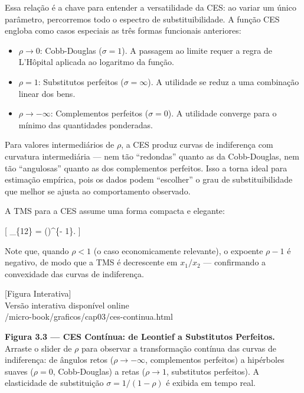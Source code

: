 \documentclass[11pt,twoside,openright]{book}
\newcommand{\figurePlaceholder}[1]{%
  \begin{center}
    \begin{tcolorbox}[
      width=0.85\textwidth,
      colback=graybg,
      colframe=gray,
      boxrule=0.5pt,
      arc=2pt,
      halign=center,
      valign=center,
      height=5cm
    ]
      \centering
      \vfill
      {\sffamily\color{gray}\large [Figura Interativa]}\\[6pt]
      {\sffamily\small\color{gray} Versão interativa disponível online}\\[4pt]
      {\ttfamily\tiny\color{gray} #1}
      \vfill
    \end{tcolorbox}
  \end{center}
}
\providecommand{\tightlist}{\setlength{\itemsep}{0pt}\setlength{\parskip}{0pt}}
\begin{document}
Essa relação é a chave para entender a versatilidade da CES: ao variar
um único parâmetro, percorremos todo o espectro de substituibilidade. A
função CES engloba como casos especiais as três formas funcionais
anteriores:

\begin{itemize}
\tightlist
\item
  \(\rho \to 0\): Cobb-Douglas (\(\sigma = 1\)). A passagem ao limite
  requer a regra de L'Hôpital aplicada ao logaritmo da função.
\item
  \(\rho = 1\): Substitutos perfeitos (\(\sigma = \infty\)). A utilidade
  se reduz a uma combinação linear dos bens.
\item
  \(\rho \to -\infty\): Complementos perfeitos (\(\sigma = 0\)). A
  utilidade converge para o mínimo das quantidades ponderadas.
\end{itemize}

Para valores intermediários de \(\rho\), a CES produz curvas de
indiferença com curvatura intermediária --- nem tão ``redondas'' quanto
as da Cobb-Douglas, nem tão ``angulosas'' quanto as dos complementos
perfeitos. Isso a torna ideal para estimação empírica, pois os dados
podem ``escolher'' o grau de substituibilidade que melhor se ajusta ao
comportamento observado.

A TMS para a CES assume uma forma compacta e elegante:

{[} \_\{12\} = \left(\right)\^{}\{\rho - 1\}.
\label{eq:3.6.12}  {]}

Note que, quando \(\rho < 1\) (o caso economicamente relevante), o
expoente \(\rho - 1\) é negativo, de modo que a TMS é decrescente em
\(x_1/x_2\) --- confirmando a convexidade das curvas de indiferença.

\figurePlaceholder{/micro-book/graficos/cap03/ces-continua.html}

\textbf{Figura 3.3 --- CES Contínua: de Leontief a Substitutos
Perfeitos.} Arraste o slider de \(\rho\) para observar a transformação
contínua das curvas de indiferença: de ângulos retos
(\(\rho \to -\infty\), complementos perfeitos) a hipérboles suaves
(\(\rho = 0\), Cobb-Douglas) a retas (\(\rho \to 1\), substitutos
perfeitos). A elasticidade de substituição \(\sigma = 1/(1-\rho)\) é
exibida em tempo real.
\end{document}
